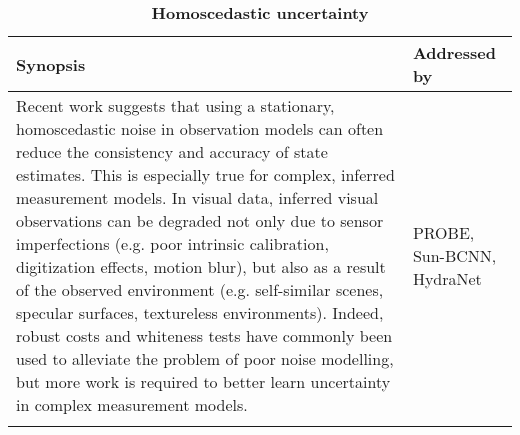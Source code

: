 \begin{table}[h!]
	\caption{\textbf{Homoscedastic uncertainty}}
	\begin{threeparttable}
	\begin{tabular}{m{}m{}}
		\toprule
		\textbf{Synopsis} & \textbf{Addressed by} \\ \midrule  
		Recent work \citep{Vega-Brown2014-sb, Hu2015-uw} suggests that using a stationary, homoscedastic noise in observation models can often reduce the consistency and accuracy of state estimates. This is especially true for complex, inferred measurement models. In visual data, inferred visual observations can be degraded not only due to sensor imperfections (e.g. poor intrinsic calibration, digitization effects, motion blur), but also as a result of the observed environment (e.g. self-similar scenes, specular surfaces, textureless environments). Indeed, robust costs \cite{Alcantarilla2016-kv, MacTavish2015-wt, Agarwal2013-jq} and whiteness tests \citep{Tsotsos2015-qs} have commonly been used to alleviate the problem of poor noise modelling, but more work is required to better learn uncertainty in complex measurement models. &  PROBE, Sun-BCNN, HydraNet \\
		& \\
		\bottomrule
	\end{tabular}
\end{threeparttable}
\end{table}

%
%
%

